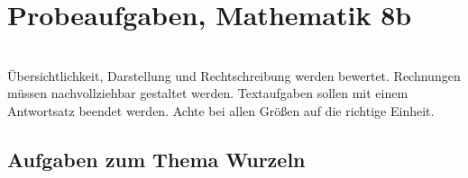 \documentclass[a4paper,11pt]{../exam2e}
\begin{document}
\pagestyle{empty}

\printanswers

\section*{Probeaufgaben, Mathematik 8b}

\gradetable[h][questions]\\[.5ex]

Übersichtlichkeit, Darstellung und Rechtschreibung werden bewertet.
Rechnungen müssen nach\-voll\-zieh\-bar gestaltet werden. 
Textaufgaben sollen mit einem Antwortsatz beendet werden. 
Achte bei allen Größen auf die richtige Einheit.



\subsection*{Aufgaben zum Thema Wurzeln}
\end{document}
